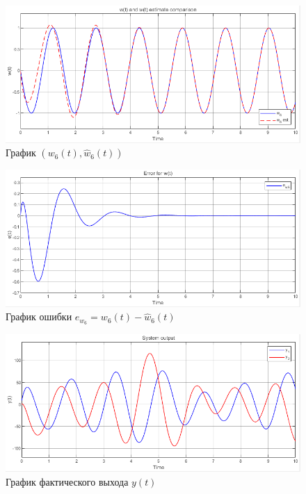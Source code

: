 \documentclass[a4paper, 12pt]{article}
\begin{document}
    \begin{figure}[H]
        \centering
        \includegraphics[scale=0.75]{2task_w6.png}
        \captionsetup{skip=0pt}
        \caption{График $(w_6(t),\hat{w}_6(t))$}
        \label{fig:2task_w6}
    \end{figure}
    \begin{figure}[H]
        \centering
        \includegraphics[scale=0.75]{2task_ew6.png}
        \captionsetup{skip=0pt}
        \caption{График ошибки $e_{w_6}=w_6(t)-\hat{w}_6(t)$}
        \label{fig:2task_ew6}
    \end{figure}
    \begin{figure}[H]
        \centering
        \includegraphics[scale=0.75]{2task_y.png}
        \captionsetup{skip=0pt}
        \caption{График фактического выхода $y(t)$}
        \label{fig:2task_y}
    \end{figure}
\end{document}
